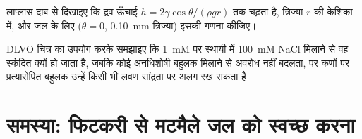 \begin{exercise}[$\star\star\star$]\label{exo:b3:colloids:11}
लाप्लास दाब से दिखाइए कि द्रव ऊँचाई $h = 2\gamma\cos\theta/(\rho gr)$ तक चढ़ता है,
त्रिज्या $r$ की केशिका में, और जल के लिए ($\theta = 0$, \qty{0.10}{mm} त्रिज्या) इसकी गणना कीजिए।
\end{exercise}

\begin{exercise}[$\star\star\star$]\label{exo:b3:colloids:12}
DLVO चित्र का उपयोग करके समझाइए कि \qty{1}{mM} पर स्थायी  में \qty{100}{mM} NaCl मिलाने से
वह स्कंदित क्यों हो जाता है, जबकि कोई अनधिशोषी बहुलक मिलाने से
अवरोध नहीं बदलता, पर कणों पर प्रत्यारोपित बहुलक उन्हें किसी भी लवण
सांद्रता पर अलग रख सकता है।
\end{exercise}

\clearpage
\enlargethispage{3\baselineskip}
\section{समस्या: फिटकरी से मटमैले जल को स्वच्छ करना}

